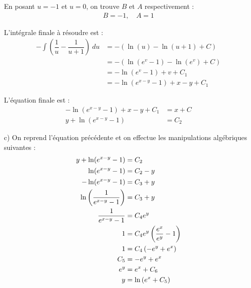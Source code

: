 En posant $u = -1$ et $u = 0$, on trouve $B$ et $A$ respectivement :
\begin{align*}
    B = -1,\quad A = 1
\end{align*}

L'intégrale finale à résoudre est :
\begin{align*}
    -\int{\left(\dfrac{1}{u}-\dfrac{1}{u+1}\right)\ du} &=
    -(\ln(u) - \ln(u+1) + C) \\
    &= -(\ln(e^v - 1) - \ln(e^v) + C) \\
    &= -\ln(e^v - 1) + v + C_1 \\
    &= -\ln(e^{x-y} - 1) + x-y + C_1
\end{align*}

L'équation finale est :
\begin{align*}
    -\ln(e^{x-y} - 1) + x-y + C_1 &= x + C \\
    y + \ln(e^{x-y} - 1) &= C_2
\end{align*}

c) On reprend l'équation précédente et on effectue les manipulations algébriques
suivantes :
\begin{align*}
    y + \ln(e^{x-y} - 1) &= C_2 \\
    \ln(e^{x-y} - 1) &= C_2 -y \\
    -\ln(e^{x-y} - 1) &= C_3 +y \\
    \ln\left(\dfrac{1}{e^{x-y} - 1}\right) &= C_3 +y \\
    \dfrac{1}{e^{x-y} - 1} &= C_4e^y \\
    1 &= C_4e^y\left({\dfrac{e^x}{e^y} - 1}\right) \\
    1 &= C_4\left({-e^y + e^x}\right) \\
    C_5 &= -e^y + e^x \\
    e^y &= e^x + C_6 \\
    y &= \ln\left({e^x + C_5}\right)
\end{align*}
